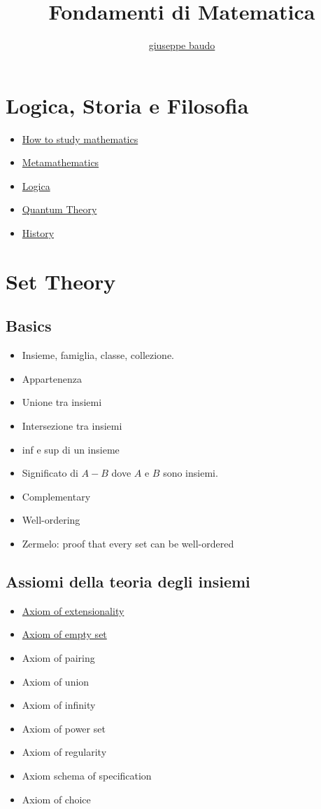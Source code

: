 \documentclass[a4paper,10pt]{article}
\title{Fondamenti di Matematica}
\author{\href{http://www.baudo.hol.es}{giuseppe baudo}}
\begin{document}
\maketitle

\section{Logica, Storia e Filosofia}
\begin{itemize}
 \item \href{HowToStudy.pdf}{How to study mathematics}
  \item \href{Metamathematics.pdf}{Metamathematics}
  \item \href{Logics.pdf}{Logica}
  \item \href{QuantumTheory.pdf}{Quantum Theory}
  \item \href{history.pdf}{History} 
\end{itemize}

\section{Set Theory}
\subsection*{Basics}
\begin{itemize}
 \item Insieme, famiglia, classe, collezione.
 \item Appartenenza
 \item Unione tra insiemi
 \item Intersezione tra insiemi 
 \item inf e sup di un insieme
 \item Significato di $A - B$ dove $A$ e $B$ sono insiemi.
 \item Complementary
 \item Well-ordering
 \item Zermelo: proof that every set can be well-ordered
\end{itemize}
 
\subsection*{Assiomi della teoria degli insiemi}
\begin{itemize}
 \item \href{./Extensionality.pdf}{Axiom of extensionality}
 \item \href{./EmptySet.pdf}{Axiom of empty set}
 \item Axiom of pairing
 \item Axiom of union
 \item Axiom of infinity
 \item Axiom of power set
 \item Axiom of regularity
 \item Axiom schema of specification
 \item Axiom of choice
\end{itemize}
\end{document}
